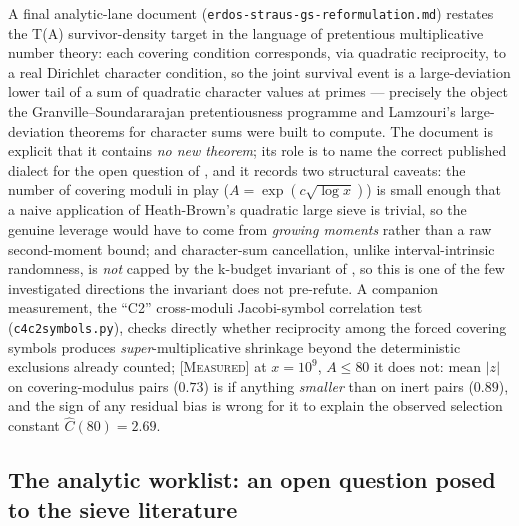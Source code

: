 \documentclass[11pt]{article}
\theoremstyle{plain}
\theoremstyle{definition}
\theoremstyle{remark}
\newcommand{\MEASURED}{\textcolor{claimed}{\textsc{[Measured]}}}
\newcommand{\file}[1]{\texttt{#1}}
\renewcommand{\_}{\textunderscore\allowbreak}
\begin{document}
A final analytic-lane document (\texttt{erdos-\allowbreak straus-\allowbreak gs-\allowbreak reformulation.md}) restates the T(A)
survivor-density target in the language of pretentious multiplicative number theory: each
covering condition corresponds, via quadratic reciprocity, to a real Dirichlet character
condition, so the joint survival event is a large-deviation lower tail of a sum of quadratic
character values at primes — precisely the object the Granville--Soundararajan pretentiousness
programme \cite{GranvilleSoundararajan2001,GranvilleSoundararajan2007} and Lamzouri's
large-deviation theorems for character sums were built to compute. The document is explicit that
it contains \emph{no new theorem}; its role is to name the correct published dialect for the
open question of , and it records two structural caveats: the number of
covering moduli in play ($A=\exp(c\sqrt{\log x})$) is small enough that a naive application of
Heath-Brown's quadratic large sieve \cite{HeathBrown1995} is trivial, so the genuine leverage
would have to come from \emph{growing moments} rather than a raw second-moment bound; and
character-sum cancellation, unlike interval-intrinsic randomness, is \emph{not} capped by the
k-budget invariant of , so this is one of the few investigated directions
the invariant does not pre-refute. A companion measurement, the ``C2'' cross-moduli
Jacobi-symbol correlation test (\file{c4\_c2\_symbols.py}), checks directly whether reciprocity
among the forced covering symbols produces \emph{super}-multiplicative shrinkage beyond the
deterministic exclusions already counted; \MEASURED{} at $x=10^9$, $A\le80$ it does not: mean
$|z|$ on covering-modulus pairs ($0.73$) is if anything \emph{smaller} than on inert pairs
($0.89$), and the sign of any residual bias is wrong for it to explain the observed selection
constant $\widehat C(80)=2.69$.

\subsection{The analytic worklist: an open question posed to the sieve literature}
\label{subsec:sievedesk}
\end{document}
